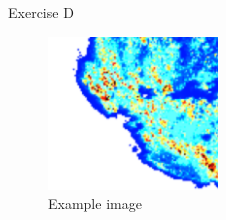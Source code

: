 Exercise D

\begin{figure}[h!]
 \begin{center}
  \includegraphics[width=0.4\textwidth]{./images/example_image}
  \caption{Example image}
  \label{f:example_image}
 \end{center}
\end{figure}
